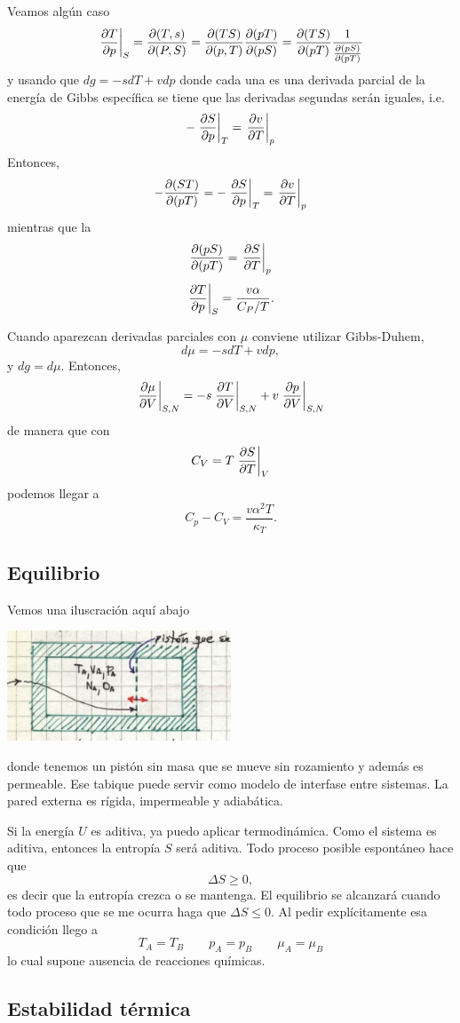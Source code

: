 \documentclass[10pt,oneside]{CBFT_book}
\begin{document}
Veamos algún caso
\[
	\dpare{T}{p}{S} = \dpar{(T,s)}{(P,S)} = 
	\dpar{(TS)}{(p,T)} \dpar{(pT)}{(pS)} =
	\dpar{(TS)}{(pT)} \frac{1}{\dpar{(pS)}{(pT)}}
\]
y usando que $dg = -sdT + vdp$ donde cada una es una derivada parcial de
la energía de Gibbs específica se tiene que las derivadas segundas serán
iguales, i.e.
\[
	- \dpare{S}{p}{T} = \dpare{v}{T}{p}
\]
Entonces, 
\[
	- \dpar{(ST)}{(pT)} = - \dpare{S}{p}{T} = \dpare{v}{T}{p}
\]
mientras que la 
\[
	\dpar{(pS)}{(pT)} = \dpare{S}{T}{p}
\]
\[
	\dpare{T}{p}{S} = \frac{ v \alpha }{ C_P / T }.
\]

Cuando aparezcan derivadas parciales con $\mu$ conviene utilizar Gibbs-Duhem,
\[
	d\mu = -s dT + v dp,
\]
y $dg = d\mu$. Entonces,
\[
	\dpare{\mu}{V}{S,N} = - s \dpare{T}{V}{S,N} + v \dpare{p}{V}{S,N}
\]
de manera que con 
\[
	C_V = T \dpare{S}{T}{V}
\]
podemos llegar a 
\[
	C_p - C_V = \frac{ v \alpha^2 T }{ \kappa_T }.
\]


\subsection{Equilibrio}

Vemos una iluscración aquí abajo

\includegraphics[width=0.50\textwidth]{images/1606329041.jpg}

donde tenemos un pistón sin masa que se mueve sin rozamiento y además es permeable.
Ese tabique puede servir como modelo de interfase entre sistemas. La pared externa
es rígida, impermeable y adiabática.

Si la energía $U$ es aditiva, ya puedo aplicar termodinámica. Como el sistema es
aditiva, entonces la entropía $S$ será aditiva. Todo proceso posible espontáneo
hace que
\[
	\Delta S \geq 0,
\]
es decir que la entropía crezca o se mantenga. El equilibrio se alcanzará cuando
todo proceso que se me ocurra haga que $\Delta S \leq 0$. Al pedir explícitamente
esa condición llego a
\[
	T_A = T_B \qquad  p_A = p_B \qquad \mu_A = \mu_B
\]
lo cual supone ausencia de reacciones químicas.


\subsection{Estabilidad térmica}
\end{document}
